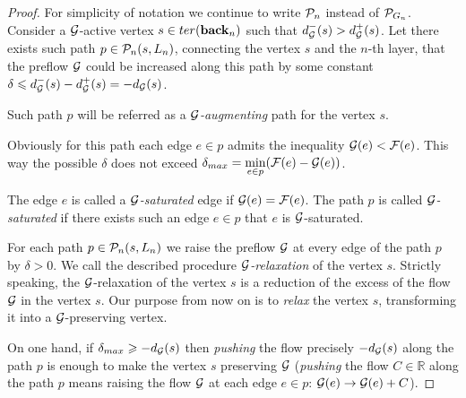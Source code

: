 \documentclass[12pt]{amsart}
\begin{document}
\begin{proof}
        For simplicity of notation we continue to write $\gnpaths$ instead of $\cal{P}_{G_n}$.
        Consider a $\cal{G}$-active vertex $s \in \ter(\eback_n)$ such that $d_{\cal{G}}^{-}(s) > d_{\cal{G}}^{+}(s)$.
        Let there exists such path $p \in \gnpaths(s, L_n)$, connecting the vertex $s$ and the $n$-th layer, that
          the preflow $\cal{G}$ could be increased along this path by some constant
          $\delta \leq d_{\cal{G}}^{-}(s) - d_{\cal{G}}^{+}(s) = -d_{\cal{G}}(s)$.
        \begin{definition}
          Such path $p$ will be referred as a \emph{$\cal{G}$-augmenting} path for the vertex $s$.
        \end{definition}
        Obviously for this path each edge $e \in p$ admits the inequality $\cal{G}(e) < \flowpos(e)$.
        This way the possible $\delta$ does not exceed $\delta_{max}=\min\limits_{e \in p}(\flowpos(e) - \cal{G}(e))$.
        \begin{definition}
          The edge $e$ is called a \emph{$\cal{G}$-saturated} edge if $\cal{G}(e) = \flowpos(e)$.
          The path $p$ is called \emph{$\cal{G}$-saturated} if there exists such an edge $e \in p$ that $e$ is $\cal{G}$-saturated.
        \end{definition}
        For each path $p \in \gnpaths(s, L_n)$ we raise the preflow $\cal{G}$ at every edge of the path $p$
        by $\delta > 0$.
        We call the described procedure \emph{$\cal{G}$-relaxation} of the vertex $s$.
        Strictly speaking, the {$\cal{G}$-relaxation}
          of the vertex $s$ is a reduction of the excess of the flow $\cal{G}$ in the vertex $s$.
        Our purpose from now on is to \emph{relax} the vertex $s$, transforming it into a $\cal{G}$-preserving vertex.

        On one hand, if $\delta_{max} \geq -d_{\cal{G}}(s)$ then \emph{pushing} the flow precisely $-d_{\cal{G}}(s)$ along the path $p$
          is enough to make the vertex $s$ preserving $\cal{G}$
          (\emph{pushing} the flow $C \in \mathbb{R}$ along the path $p$ means raising the flow $\cal{G}$ at each edge $e \in p$:
          $\cal{G}(e) \to \cal{G}(e) + C$).
        

\end{proof}
\end{document}
